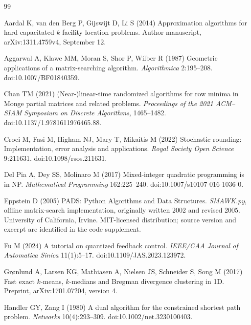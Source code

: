 \begin{thebibliography}{99}\raggedright
{}
Aardal K, van den Berg P, Gijswijt D, Li S (2014) Approximation algorithms for hard capacitated $k$-facility location problems. Author manuscript, arXiv:1311.4759v4, September 12.

Aggarwal A, Klawe MM, Moran S, Shor P, Wilber R (1987) Geometric applications of a matrix-searching algorithm. \emph{Algorithmica} 2:195--208. doi:10.1007/BF01840359.

Chan TM (2021) (Near-)linear-time randomized algorithms for row minima in Monge partial matrices and related problems. \emph{Proceedings of the 2021 ACM--SIAM Symposium on Discrete Algorithms}, 1465--1482. doi:10.1137/1.9781611976465.88.

Croci M, Fasi M, Higham NJ, Mary T, Mikaitis M (2022) Stochastic rounding: Implementation, error analysis and applications. \emph{Royal Society Open Science} 9:211631. doi:10.1098/rsos.211631.

Del Pia A, Dey SS, Molinaro M (2017) Mixed-integer quadratic programming is in NP. \emph{Mathematical Programming} 162:225--240. doi:10.1007/s10107-016-1036-0.

Eppstein D (2005) PADS: Python Algorithms and Data Structures. \emph{SMAWK.py}, offline matrix-search implementation, originally written 2002 and revised 2005. University of California, Irvine. MIT-licensed distribution; source version and excerpt are identified in the code supplement.

Fu M (2024) A tutorial on quantized feedback control. \emph{IEEE/CAA Journal of Automatica Sinica} 11(1):5--17. doi:10.1109/JAS.2023.123972.

Gr{\o}nlund A, Larsen KG, Mathiasen A, Nielsen JS, Schneider S, Song M (2017) Fast exact $k$-means, $k$-medians and Bregman divergence clustering in 1D. Preprint, arXiv:1701.07204, version 4.

Handler GY, Zang I (1980) A dual algorithm for the constrained shortest path problem. \emph{Networks} 10(4):293--309. doi:10.1002/net.3230100403.


\end{thebibliography}
